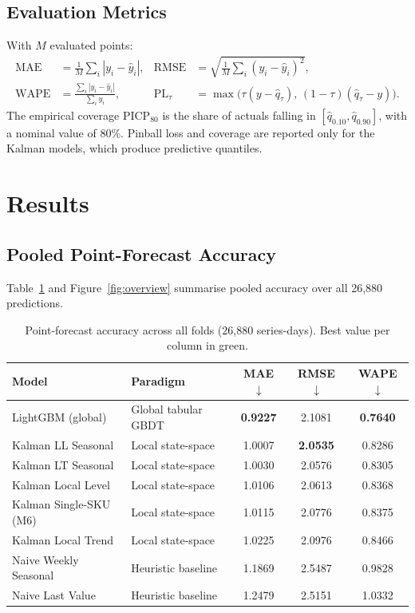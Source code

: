 \documentclass[11pt,a4paper]{article}
\newcommand{\best}[1]{\textbf{\textcolor{good}{#1}}}
\begin{document}
\subsection{Evaluation Metrics}
With $M$ evaluated points:
\begin{align}
  \mathrm{MAE} &= \frac1M\sum_i |y_i-\hat y_i|, &
  \mathrm{RMSE} &= \sqrt{\frac1M\sum_i (y_i-\hat y_i)^2},\\
  \mathrm{WAPE} &= \frac{\sum_i |y_i-\hat y_i|}{\sum_i y_i}, &
  \mathrm{PL}_\tau &= \max\!\big(\tau(y-\hat q_\tau),\,(1-\tau)(\hat q_\tau-y)\big).
\end{align}
The empirical coverage $\mathrm{PICP}_{80}$ is the share of actuals falling in $[\hat q_{0.10},\hat q_{0.90}]$, with a nominal value of 80\%. Pinball loss and coverage are reported only for the Kalman models, which produce predictive quantiles.

\section{Results}

\subsection{Pooled Point-Forecast Accuracy}
Table~\ref{tab:point} and Figure~\ref{fig:overview} summarise pooled accuracy over all 26,880 predictions.

\begin{table}[H]
\centering
\caption{Point-forecast accuracy across all folds (26,880 series-days). Best value per column in green.}
\label{tab:point}
\small
\renewcommand{\arraystretch}{1.2}
\begin{tabular}{@{}l l c c c@{}}
\toprule
\textbf{Model} & \textbf{Paradigm} & \textbf{MAE} $\downarrow$ & \textbf{RMSE} $\downarrow$ & \textbf{WAPE} $\downarrow$\\
\midrule
LightGBM (global)        & Global tabular GBDT & \best{0.9227} & 2.1081 & \best{0.7640}\\
Kalman LL Seasonal       & Local state-space   & 1.0007 & \best{2.0535} & 0.8286\\
Kalman LT Seasonal       & Local state-space   & 1.0030 & 2.0576 & 0.8305\\
Kalman Local Level       & Local state-space   & 1.0106 & 2.0613 & 0.8368\\
Kalman Single-SKU (M6)   & Local state-space   & 1.0115 & 2.0776 & 0.8375\\
Kalman Local Trend       & Local state-space   & 1.0225 & 2.0976 & 0.8466\\
Naive Weekly Seasonal    & Heuristic baseline  & 1.1869 & 2.5487 & 0.9828\\
Naive Last Value         & Heuristic baseline  & 1.2479 & 2.5151 & 1.0332\\
\bottomrule
\end{tabular}
\end{table}
\end{document}
